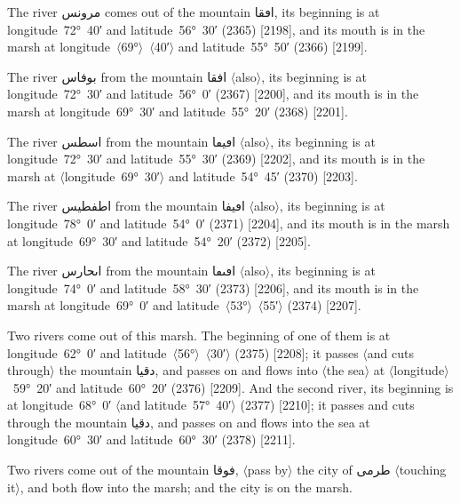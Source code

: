 \documentclass[11pt]{article}
\newcommand{\Pg}[1]{\marginpar{\footnotesize #1}}
\newcommand{\Ang}[1]{\ensuremath{#1}}
\begin{document}
The river \textarabic{مرونس} comes out of the mountain \textarabic{اڡقا}, its beginning is at longitude~72°~40′ and latitude~56°~30′ (2365) [2198], and its mouth is in the marsh at longitude~\Ang{\langle}69°\Ang{\rangle}~\Ang{\langle}40′\Ang{\rangle} and latitude~55°~50′ (2366) [2199].

The river \textarabic{بوفاس} from the mountain \textarabic{افقا} \Ang{\langle}also\Ang{\rangle}, its beginning is at longitude~72°~30′ and latitude~56°~0′ (2367) [2200], and its mouth is in the marsh at longitude~69°~30′ and latitude~55°~20′ (2368) [2201].

The river \textarabic{اسطس} from the mountain \textarabic{اڡيڡا} \Ang{\langle}also\Ang{\rangle}, its beginning is at longitude~72°~30′ and latitude~55°~30′ (2369) [2202]\Pg{p. 156}, and its mouth is in the marsh at \Ang{\langle}longitude~69°~30′\Ang{\rangle} and latitude~54°~45′ (2370) [2203].

The river \textarabic{اطفطيس} from the mountain \textarabic{اڡيفا} \Ang{\langle}also\Ang{\rangle}, its beginning is at longitude~78°~0′ and latitude~54°~0′ (2371) [2204], and its mouth is in the marsh at longitude~69°~30′ and latitude~54°~20′ (2372) [2205].

The river \textarabic{اٮحارس} from the mountain \textarabic{اڡٮڡا} \Ang{\langle}also\Ang{\rangle}, its beginning is at longitude~74°~0′ and latitude~58°~30′ (2373) [2206], and its mouth is in the marsh at longitude~69°~0′ and latitude~\Ang{\langle}53°\Ang{\rangle}~\Ang{\langle}55′\Ang{\rangle} (2374) [2207].

Two rivers come out of this marsh. The beginning of one of them is at longitude~62°~0′ and latitude~\Ang{\langle}56°\Ang{\rangle}~\Ang{\langle}30′\Ang{\rangle} (2375) [2208]; it passes \Ang{\langle}and cuts through\Ang{\rangle} the mountain \textarabic{دقيا}, and passes on and flows into \Ang{\langle}the sea\Ang{\rangle} at \Ang{\langle}longitude\Ang{\rangle}~59°~20′ and latitude~60°~20′ (2376) [2209]. And the second river, its beginning is at longitude~68°~0′ \Ang{\langle}and latitude~57°~40′\Ang{\rangle} (2377) [2210]; it passes and cuts through the mountain \textarabic{دقيا}, and passes on and flows into the sea at longitude~60°~30′ and latitude~60°~30′ (2378) [2211].

Two rivers come out of the mountain \textarabic{فوقا}, \Ang{\langle}pass by\Ang{\rangle} the city of \textarabic{طرمى} \Ang{\langle}touching it\Ang{\rangle}, and both flow into the marsh; and the city is on the marsh.
\end{document}
